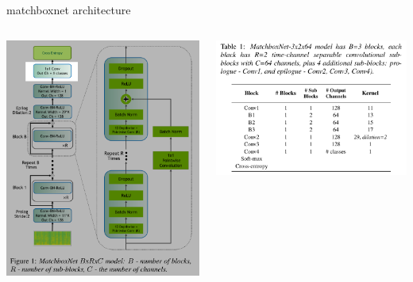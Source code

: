 \documentclass[aspectratio=169,xcolor={dvipsnames,svgnames}]{beamer}
\begin{document}
\begin{frame}[label={sec:orgeb3f51f}]{matchboxnet architecture}
\begin{columns}
\begin{column}{0.45\columnwidth}
{\begin{center}
\includegraphics[width=.9\linewidth]{org-download-images/matchboxnet/2024-11-19_11-12-42_screenshot.png}
\end{center}
}
\end{column}

\begin{column}{.55\columnwidth}
\begin{center}
\includegraphics[width=.9\linewidth]{org-download-images/matchboxnet/2024-11-19_11-14-11_screenshot.png}
\end{center}
\end{column}
\end{columns}
\end{frame}
\end{document}
